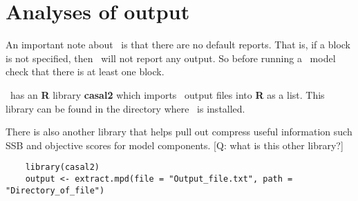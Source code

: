 \section{Analyses of output}\label{Sec:output}
An important note about \CNAME\ is that there are no default reports. That is, if a  block is not specified, then \CNAME\ will not report any output. So before running a \CNAME\ model check that there is at least one  block.

\CNAME\ has an \textbf{R} library \textbf{casal2} which imports \CNAME\ output files into \textbf{R} as a list. This library can be found in the directory where \CNAME\ is installed.

There is also another library that helps pull out compress useful information such SSB and objective scores for model components. [Q:  what is this other library?]

{\small{\begin{verbatim}
	library(casal2)
	output <- extract.mpd(file = "Output_file.txt", path = "Directory_of_file")
\end{verbatim}}}
